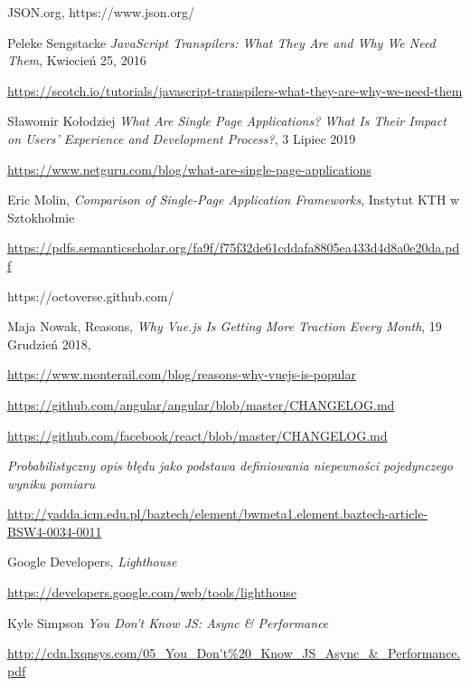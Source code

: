 \cleardoublepage
{}
{}


\begin{thebibliography}{99}

   JSON.org, https://www.json.org/
  
  Peleke Sengstacke
  \emph{JavaScript Transpilers: What They Are and Why We Need Them},
  Kwiecień 25, 2016

  \url{https://scotch.io/tutorials/javascript-transpilers-what-they-are-why-we-need-them}

Sławomir Kołodziej
\emph{What Are Single Page Applications? What Is Their Impact on Users’ Experience and Development Process?},
3 Lipiec 2019

\url{https://www.netguru.com/blog/what-are-single-page-applications}

Eric Molin, 
\emph{Comparison of Single-Page Application Frameworks},
Instytut KTH w  Sztokholmie

\url{https://pdfs.semanticscholar.org/fa9f/f75f32de61cddafa8805ea433d4d8a0e20da.pdf}

https://octoverse.github.com/

Maja Nowak, Reasons,
\emph{Why Vue.js Is Getting More Traction Every Month},
19 Grudzień 2018, 

\url{https://www.monterail.com/blog/reasons-why-vuejs-is-popular}


\url{https://github.com/angular/angular/blob/master/CHANGELOG.md}

 
\url{https://github.com/facebook/react/blob/master/CHANGELOG.md}

\emph{Probabilistyczny opis błędu jako podstawa definiowania niepewności pojedynczego wyniku pomiaru}

\url{http://yadda.icm.edu.pl/baztech/element/bwmeta1.element.baztech-article-BSW4-0034-0011}

Google Developers,
\emph{Lighthouse}

\url{https://developers.google.com/web/tools/lighthouse}

Kyle Simpson
\emph{You Don't Know JS: Async \& Performance}

\url{http://cdn.lxqnsys.com/05_You_Don't\%20_Know_JS_Async_\&_Performance.pdf}


\end{thebibliography}
